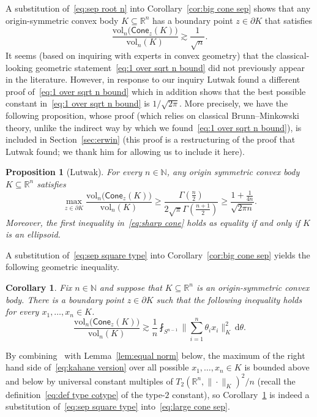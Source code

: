 \documentclass[11pt,reqno]{amsart}
\renewcommand{\ge}{\geqslant}
\newcommand{\ud}[0]{\,\mathrm{d}}
\newcommand{\R}{\mathbb R}
\newtheorem{proposition}[theorem]{Proposition}
\newtheorem{corollary}[theorem]{Corollary}
\theoremstyle{remark}
\renewcommand{\subset}{\subseteq}
\newcommand{\N}{\mathbb N}
\newcommand{\vol}{\mathrm{vol}}
\renewcommand{\1}{\mathbf 1}
\newcommand{\cone}{\mathsf{Cone}}
\begin{document}
A substitution of~\eqref{eq:sep root n} into Corollary~\ref{cor:big cone sep}  shows that  any origin-symmetric convex body $K\subset \R^n$ has a boundary point $z\in \partial K$ that satisfies
\begin{equation}\label{eq:1 over sqrt n bound}
\frac{\vol_n\big(\cone_z(K)\big)}{\vol_n(K)}\gtrsim \frac{1}{\sqrt{n}}.
\end{equation}
It seems (based on inquiring with  experts in convex geometry) that the classical-looking geometric statement~\eqref{eq:1 over sqrt n bound} did not previously appear in the literature. However, in response to our inquiry Lutwak found a different proof of~\eqref{eq:1 over sqrt n bound} which in addition shows that the best possible constant in~\eqref{eq:1 over sqrt n bound} is $1/\sqrt{2\pi}$. More precisely, we have the following proposition, whose proof (which relies on classical Brunn--Minkowski theory, unlike the indirect way by which we found~\eqref{eq:1 over sqrt n bound}), is included  in Section~\ref{sec:erwin} (this proof is a restructuring of the proof that Lutwak found; we thank him for allowing us to include it here).
\begin{proposition}[Lutwak]\label{prop:large cone} For every $n\in \N$, any origin symmetric convex body $K\subset \R^n$ satisfies
\begin{equation}\label{eq:sharp cone}
\max_{z\in \partial K} \frac{\vol_n\big(\cone_z(K)\big)}{\vol_n(K)}\ge  \frac{\Gamma\left(\frac{n}{2}\right)}{2\sqrt{\pi}\Gamma\left(\frac{n+1}{2}\right)}\ge \frac{1+\frac{1}{4n}}{\sqrt{2\pi n}}.
\end{equation}
Moreover, the first inequality in~\eqref{eq:sharp cone} holds as equality if and only if $K$ is an ellipsoid.
\end{proposition}

A substitution of~\eqref{eq:sep square type} into Corollary~\ref{cor:big cone sep}  yields  the following geometric inequality.
\begin{corollary}\label{prop:elton} Fix $n\in \N$ and suppose that $K\subset \R^n$ is an origin-symmetric convex body. There is a boundary point $z\in \partial K$ such that the following inequality holds for every $x_1,\ldots,x_n\in K$.
\begin{equation}\label{eq:kahane version}
\frac{\vol_n\big(\cone_z(K)\big)}{\vol_n(K)} \gtrsim \frac{1}{n} \fint_{S^{n-1}} \Big\|\sum_{i=1}^n \theta_i x_i\Big\|_K^2\ud \theta.
\end{equation}
\end{corollary}
By combining~\cite{Tom79} with Lemma~\ref{lem:equal norm} below, the maximum of the right hand side of~\eqref{eq:kahane version} over all possible $x_1,\ldots,x_n\in K$ is bounded above and below by universal constant multiples of $T_2(\R^n,\|\cdot\|_K)^2/n$ (recall the definition~\eqref{eq:def type cotype} of the type-$2$ constant), so Corollary~\ref{prop:elton} is indeed a substitution of~\eqref{eq:sep square type} into~\eqref{eq:large cone sep}.
\end{document}
